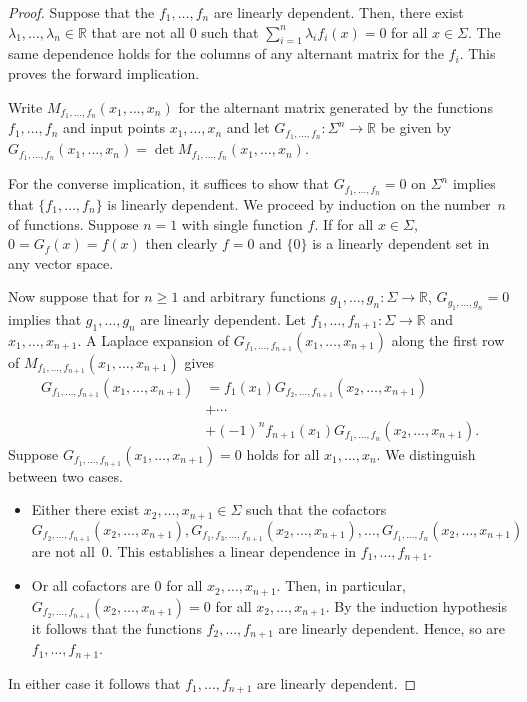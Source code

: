 \documentclass[a4paper,UKenglish,cleveref, autoref,mathscr]{lipics-v2019}
\newcommand{\RR}{\mathbb{R}}
\newcommand{\1}{\mathbbm{1}}
\begin{document}
\begin{proof}
Suppose that the $f_1, \dots, f_n$ are linearly dependent. Then, there exist $\lambda_1, \dots, \lambda_n \in \RR$ that are not all $0$ such that $\sum_{i = 1}^n \lambda_i f_i(x) = 0$ for all $x \in \Sigma$. The same dependence holds for the columns of any alternant matrix for the $f_i$. This proves the forward implication.

Write $M_{f_1, \dots, f_n}(x_1, \dots, x_n)$ for the alternant matrix generated by the functions $f_1, \dots, f_n$ and input points $x_1, \dots, x_n$ and let $G_{f_1, \dots, f_n} : \Sigma^n \rightarrow \RR$ be given by $G_{f_1, \dots, f_n}(x_1, \dots, x_n) = \det M_{f_1, \dots, f_n}(x_1, \dots, x_n)$.


For the converse implication, it suffices to show that $G_{f_1, \dots, f_n} = 0$ on $\Sigma^n$ implies that $\{f_1, \dots, f_n\}$ is linearly dependent. We proceed by induction on the number~$n$ of functions. Suppose $n = 1$ with single function $f$. If for all $x \in \Sigma$, $0 = G_f(x) = f(x)$ then clearly $f = 0$ and $\{0\}$ is a linearly dependent set in any vector space.

Now suppose that for $n \geq 1$ and arbitrary functions $g_1, \dots, g_n : \Sigma \rightarrow \RR$, $G_{g_1, \dots , g_n} = 0$ implies that $g_1, \dots, g_n$ are linearly dependent. Let $f_1, \dots, f_{n+1} : \Sigma \rightarrow \RR$ and $x_1, \dots, x_{n + 1}$. A Laplace expansion of $G_{f_1, \dots, f_{n+1}}(x_1, \dots, x_{n+1})$ along the first row of $M_{f_1, \dots, f_{n+1}}(x_1, \dots, x_{n+1})$ gives
\begin{equation*}
\begin{split}
G_{f_1, \dots, f_{n+1}}(x_1, \dots, x_{n+1}) & = f_1(x_1) G_{f_2, \dots, f_{n+1}}(x_2, \dots, x_{n+1}) \\
& +  \cdots \\
& + (-1)^{n} f_{n+1}(x_1) G_{f_1, \dots, f_n}(x_2, \dots, x_{n+1}).
\end{split}
\end{equation*}
Suppose $G_{f_1, \dots, f_{n+1}}(x_1, \dots, x_{n+1}) = 0$ holds for all $x_1, \dots, x_n$.
We distinguish between two cases.
\begin{itemize}
\item Either there exist $x_2, \dots, x_{n+1} \in \Sigma$ such that the cofactors \[G_{f_2, \dots, f_{n+1}}(x_2, \dots, x_{n+1}), G_{f_1, f_3, \dots, f_{n+1}}(x_2, \dots, x_{n+1}), \dots, G_{f_1, \dots, f_n}(x_2, \dots, x_{n+1})\] are not all~$0$.
    This establishes a linear dependence in $f_1, \dots, f_{n+1}$.
\item Or all cofactors are $0$ for all $x_2, \dots, x_{n+1}$.
 Then, in particular, $G_{f_2, \dots, f_{n+1}}(x_2, \dots, x_{n+1}) = 0$ for all $x_2, \dots, x_{n+1}$.
 By the induction hypothesis it follows that the functions $f_2, \dots, f_{n+1}$ are linearly dependent.
 Hence, so are $f_1, \dots, f_{n+1}$.
\end{itemize}
In either case it follows that $f_1, \dots, f_{n+1}$ are linearly dependent.
\end{proof}
\end{document}
